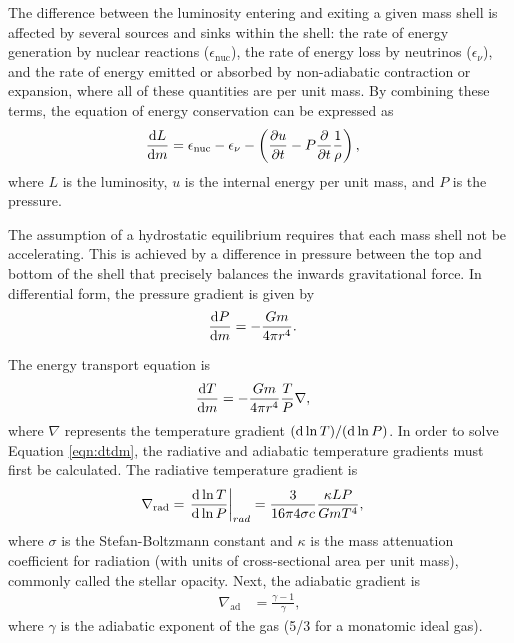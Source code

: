 The difference between the luminosity entering and exiting a given mass shell is affected by several sources and sinks within the shell: the rate of energy generation by nuclear reactions ($\epsilon_\mathrm{nuc}$), the rate of energy loss by neutrinos ($\epsilon_\nu$), and the rate of energy emitted or absorbed by non-adiabatic contraction or expansion, where all of these quantities are per unit mass. By combining these terms, the equation of energy conservation can be expressed as
\begin{align}\label{eq:luminosity}
	\frac{\mathrm{d} L}{\mathrm{d} m} &= \epsilon_\mathrm{nuc} - \epsilon_\nu - \left(\frac{\partial u}{\partial t} - P\frac{\partial}{\partial t}\frac{1}{\rho}\right),
\end{align}
where $L$ is the luminosity, $u$ is the internal energy per unit mass, and $P$ is the pressure.

The assumption of a hydrostatic equilibrium requires that each mass shell not be accelerating. This is achieved by a difference in pressure between the top and bottom of the shell that precisely balances the inwards gravitational force. In differential form, the pressure gradient is given by
\begin{align}
	\frac{\mathrm{d} P}{\mathrm{d} m} &= -\frac{Gm}{4\pi r^4}.
\end{align}

The energy transport equation is
\begin{align}\label{eqn:dtdm}
	\frac{\mathrm{d} T}{\mathrm{d} m} &= -\frac{Gm}{4\pi r^4}\frac{T}{P}\nabla,
\end{align}
where $\nabla$ represents the temperature gradient $(\mathrm{d} \ln T) / (\mathrm{d} \ln P)$. In order to solve Equation \ref{eqn:dtdm}, the radiative and adiabatic temperature gradients must first be calculated. The radiative temperature gradient is
\begin{align}
	\nabla_\mathrm{rad} &= \left.\frac{\mathrm{d} \ln T}{\mathrm{d} \ln P}\right|_{rad} = \frac{3}{16\pi 4\sigma c}\frac{\kappa LP}{G m T^4},
\end{align}
where $\sigma$ is the Stefan-Boltzmann constant and $\kappa$ is the mass attenuation coefficient for radiation (with units of cross-sectional area per unit mass), commonly called the stellar opacity. Next, the adiabatic gradient is
\begin{align}
	\nabla_\mathrm{ad} &= \frac{\gamma - 1}{\gamma},
\end{align}
where $\gamma$ is the adiabatic exponent of the gas (5/3 for a monatomic ideal gas).

